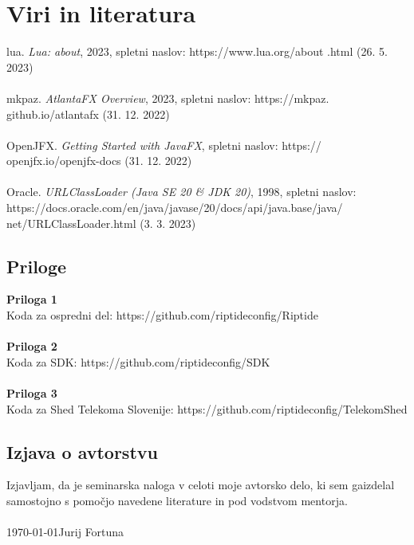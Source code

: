 \documentclass[12pt]{article}
\begin{document}
\section{Viri in literatura}
lua. \textit{Lua: about}, 2023, spletni naslov: https://www.lua.org/about
.html (26. 5. 2023)
\\\\
mkpaz. \textit{AtlantaFX Overview}, 2023, spletni naslov: https://mkpaz.
github.io/atlantafx (31. 12. 2022)
\\\\
OpenJFX. \textit{Getting Started with JavaFX}, spletni naslov: https://
openjfx.io/openjfx-docs (31. 12. 2022)
\\\\
Oracle. \textit{URLClassLoader (Java SE 20 \& JDK 20)}, 1998, spletni
naslov: https://docs.oracle.com/en/java/javase/20/docs/api/java.base/java/
net/URLClassLoader.html (3. 3. 2023)
\newpage

\begin{samepage}
	\thispagestyle{empty}
	\section*{Priloge}
	\textbf{Priloga 1}\\
	Koda za ospredni del: https://github.com/riptideconfig/Riptide
	\\\\
	\textbf{Priloga 2}\\
	Koda za SDK: https://github.com/riptideconfig/SDK
	\\\\
	\textbf{Priloga 3}\\
	Koda za Shed Telekoma Slovenije: https://github.com/riptideconfig/TelekomShed
\end{samepage}
\newpage

\begin{samepage}
	\thispagestyle{empty}
	\section*{Izjava o avtorstvu}
	Izjavljam, da je seminarska naloga v celoti moje avtorsko delo, ki sem
	gaizdelal samostojno s pomočjo navedene literature in pod vodstvom
	mentorja.
	\\\\
	\MMYYYYdate\today \hfill Jurij Fortuna
\end{samepage}
\end{document}
